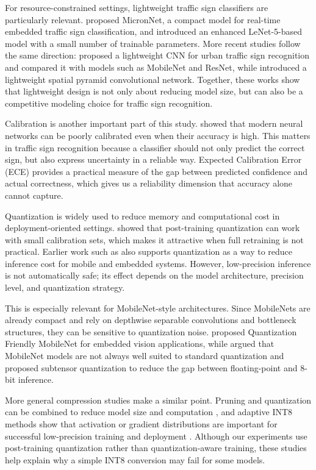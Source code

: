 \documentclass{article} %
\begin{document}
For resource-constrained settings, lightweight traffic sign classifiers are particularly relevant. \citet{wong2018micronnet} proposed MicronNet, a compact model for real-time embedded traffic sign classification, and \citet{zaibi2021lenet} introduced an enhanced LeNet-5-based model with a small number of trainable parameters. More recent studies follow the same direction: \citet{khan2023lightweightcnn} proposed a lightweight CNN for urban traffic sign recognition and compared it with models such as MobileNet and ResNet, while \citet{rachmadi2018lspcnn} introduced a lightweight spatial pyramid convolutional network. Together, these works show that lightweight design is not only about reducing model size, but can also be a competitive modeling choice for traffic sign recognition.

Calibration is another important part of this study. \citet{guo2017calibration} showed that modern neural networks can be poorly calibrated even when their accuracy is high. This matters in traffic sign recognition because a classifier should not only predict the correct sign, but also express uncertainty in a reliable way. Expected Calibration Error (ECE) provides a practical measure of the gap between predicted confidence and actual correctness, which gives us a reliability dimension that accuracy alone cannot capture.

Quantization is widely used to reduce memory and computational cost in deployment-oriented settings. \citet{hubara2021ptq} showed that post-training quantization can work with small calibration sets, which makes it attractive when full retraining is not practical. Earlier work such as \citet{park2017weightedentropy} also supports quantization as a way to reduce inference cost for mobile and embedded systems. However, low-precision inference is not automatically safe; its effect depends on the model architecture, precision level, and quantization strategy.

This is especially relevant for MobileNet-style architectures. Since MobileNets are already compact and rely on depthwise separable convolutions and bottleneck structures, they can be sensitive to quantization noise. \citet{kulkarni2021qfmobile} proposed Quantization Friendly MobileNet for embedded vision applications, while \citet{dinh2020subtensor} argued that MobileNet models are not always well suited to standard quantization and proposed subtensor quantization to reduce the gap between floating-point and 8-bit inference.

More general compression studies make a similar point. Pruning and quantization can be combined to reduce model size and computation \citep{tung2018clipq}, and adaptive INT8 methods show that activation or gradient distributions are important for successful low-precision training and deployment \citep{zhao2021distributionadaptive}. Although our experiments use post-training quantization rather than quantization-aware training, these studies help explain why a simple INT8 conversion may fail for some models.
\end{document}
